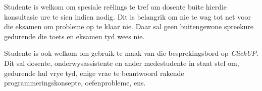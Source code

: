         Studente is welkom om spesiale re\"{e}lings te tref om dosente buite
        hierdie konsultasie ure te sien indien nodig.  Dit is belangrik om nie
        te wag tot net voor die eksamen om probleme op te klaar nie.  Daar sal
        geen buitengewone spreekure gedurende die toets en eksamen tyd wees
        nie.

        Studente is ook welkom om gebruik te maak van die besprekingsbord
        op \textit{ClickUP}.  Dit sal dosente, onderwysassistente en ander
        medestudente in staat stel om, gedurende hul vrye tyd, enige vrae te
        beantwoord rakende programmeringskonsepte, oefenprobleme, ens.
